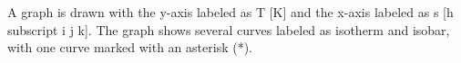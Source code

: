 A graph is drawn with the y-axis labeled as T [K] and the x-axis labeled as s [h subscript i j k]. The graph shows several curves labeled as isotherm and isobar, with one curve marked with an asterisk (*).